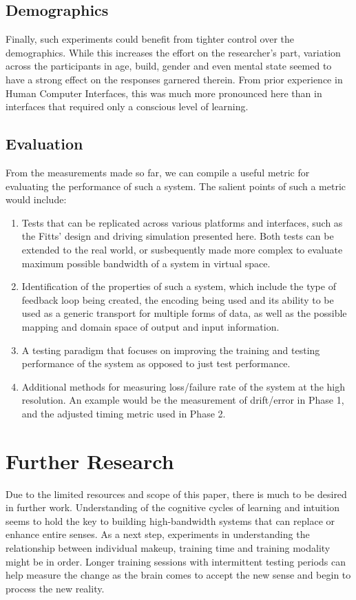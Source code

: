 \documentclass[
hidelinks,
12pt, %
oneside, %
english, %
doublespacing, %
headsepline, %
]{MastersDoctoralThesis} %
\begin{document}
\subsection{Demographics}

Finally, such experiments could benefit from tighter control over the demographics. While this increases the effort on the researcher's part, variation across the participants in age, build, gender and even mental state seemed to have a strong effect on the responses garnered therein. From prior experience in Human Computer Interfaces, this was much more pronounced here than in interfaces that required only a conscious level of learning.

\subsection{Evaluation}

From the measurements made so far, we can compile a useful metric for evaluating the performance of such a system. The salient points of such a metric would include:
\begin{enumerate}
	\item Tests that can be replicated across various platforms and interfaces, such as the Fitts' design and driving simulation presented here. Both tests can be extended to the real world, or susbequently made more complex to evaluate maximum possible bandwidth of a system in virtual space.
	\item Identification of the properties of such a system, which include the type of feedback loop being created, the encoding being used and its ability to be used as a generic transport for multiple forms of data, as well as the possible mapping and domain space of output and input information.
	\item A testing paradigm that focuses on improving the training and testing performance of the system as opposed to just test performance.
	\item Additional methods for measuring loss/failure rate of the system at the high resolution. An example would be the measurement of drift/error in Phase 1, and the adjusted timing metric used in Phase 2.
\end{enumerate}

\section{Further Research}

Due to the limited resources and scope of this paper, there is much to be desired in further work. Understanding of the cognitive cycles of learning and intuition seems to hold the key to building high-bandwidth systems that can replace or enhance entire senses. As a next step, experiments in understanding the relationship between individual makeup, training time and training modality might be in order. Longer training sessions with intermittent testing periods can help measure the change as the brain comes to accept the new sense and begin to process the new reality.
\end{document}
